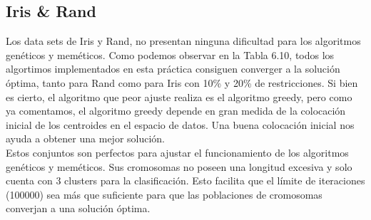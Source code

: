 \subsection{Iris \& Rand}
Los data sets de Iris y Rand, no presentan ninguna dificultad para los algoritmos genéticos y meméticos. Como podemos observar en la Tabla 6.10, todos los algortimos implementados en esta práctica consiguen converger a la solución óptima, tanto para Rand como para Iris con 10\% y 20\% de restricciones. Si bien es cierto, el algoritmo que peor ajuste realiza es el algoritmo greedy, pero como ya comentamos, el algoritmo greedy depende en gran medida de la colocación inicial de los centroides en el espacio de datos. Una buena colocación inicial nos ayuda a obtener una mejor solución.
\\
Estos conjuntos son perfectos para ajustar el funcionamiento de los algoritmos genéticos y meméticos. Sus cromosomas no poseen una longitud excesiva y solo cuenta con 3 clusters para la clasificación. Esto facilita que el límite de iteraciones (100000) sea más que suficiente para que las poblaciones de cromosomas converjan a una solución óptima.

